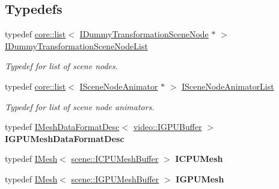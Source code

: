 \subsection*{Typedefs}
\begin{DoxyCompactItemize}
\item 
typedef \hyperlink{classirr_1_1core_1_1list}{core\+::list}$<$ \hyperlink{classirr_1_1scene_1_1IDummyTransformationSceneNode}{I\+Dummy\+Transformation\+Scene\+Node} $\ast$ $>$ \hyperlink{namespaceirr_1_1scene_aecf59ccdfe09cca7bb6ab6a471a6c0ab}{I\+Dummy\+Transformation\+Scene\+Node\+List}\hypertarget{namespaceirr_1_1scene_aecf59ccdfe09cca7bb6ab6a471a6c0ab}{}\label{namespaceirr_1_1scene_aecf59ccdfe09cca7bb6ab6a471a6c0ab}

\begin{DoxyCompactList}\small\item\em Typedef for list of scene nodes. \end{DoxyCompactList}\item 
typedef \hyperlink{classirr_1_1core_1_1list}{core\+::list}$<$ \hyperlink{classirr_1_1scene_1_1ISceneNodeAnimator}{I\+Scene\+Node\+Animator} $\ast$ $>$ \hyperlink{namespaceirr_1_1scene_a4699e14043e59f91c454ffc13edd953c}{I\+Scene\+Node\+Animator\+List}\hypertarget{namespaceirr_1_1scene_a4699e14043e59f91c454ffc13edd953c}{}\label{namespaceirr_1_1scene_a4699e14043e59f91c454ffc13edd953c}

\begin{DoxyCompactList}\small\item\em Typedef for list of scene node animators. \end{DoxyCompactList}\item 
typedef \hyperlink{classirr_1_1scene_1_1IMeshDataFormatDesc}{I\+Mesh\+Data\+Format\+Desc}$<$ \hyperlink{classirr_1_1video_1_1IGPUBuffer}{video\+::\+I\+G\+P\+U\+Buffer} $>$ {\bfseries I\+G\+P\+U\+Mesh\+Data\+Format\+Desc}\hypertarget{namespaceirr_1_1scene_a34773e8a22fb8976a27ea23fb5e9e629}{}\label{namespaceirr_1_1scene_a34773e8a22fb8976a27ea23fb5e9e629}

\item 
typedef \hyperlink{classirr_1_1scene_1_1IMesh}{I\+Mesh}$<$ \hyperlink{classirr_1_1scene_1_1ICPUMeshBuffer}{scene\+::\+I\+C\+P\+U\+Mesh\+Buffer} $>$ {\bfseries I\+C\+P\+U\+Mesh}\hypertarget{namespaceirr_1_1scene_a3b7d8631fad46d127372134b41729680}{}\label{namespaceirr_1_1scene_a3b7d8631fad46d127372134b41729680}

\item 
typedef \hyperlink{classirr_1_1scene_1_1IMesh}{I\+Mesh}$<$ \hyperlink{classirr_1_1scene_1_1IGPUMeshBuffer}{scene\+::\+I\+G\+P\+U\+Mesh\+Buffer} $>$ {\bfseries I\+G\+P\+U\+Mesh}\hypertarget{namespaceirr_1_1scene_afcea8e338679c4eac58315b9d5f1e393}{}\label{namespaceirr_1_1scene_afcea8e338679c4eac58315b9d5f1e393}

\end{DoxyCompactItemize}
